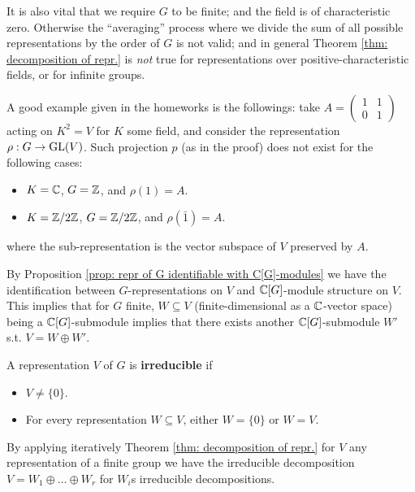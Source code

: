 \begin{remark}\label{rmk: counterexample for nonzero char. field or infintie group}
    It is also vital that we require $G$ to be finite; and the field is of characteristic zero. Otherwise the ``averaging'' process where we divide the sum of all possible representations by the order of $G$ is not valid; and in general Theorem \ref{thm: decomposition of repr.} is \emph{not} true for representations over positive-characteristic fields, or for infinite groups.
    
    A good example given in the homeworks is the followings: take $A = \begin{pmatrix} 1 & 1 \\ 0 & 1 \end{pmatrix}$ acting on $K^2 = V$ for $K$ some field, and consider the representation $\rho: G \to \mathrm{GL}(V)$. Such projection $p$ (as in the proof) does not exist for the following cases:
    \begin{itemize}
        \item $K = \mathbb{C}$, $G = \mathbb{Z}$, and $\rho(1) = A$.
        \item $K = \mathbb{Z}/2\mathbb{Z}$, $G = \mathbb{Z}/2\mathbb{Z}$, and $\rho(\bar{1}) = A$.
    \end{itemize}
    where the sub-representation is the vector subspace of $V$ preserved by $A$. 
\end{remark}

\begin{remark}
    By Proposition \ref{prop: repr of G identifiable with C[G]-modules} we have the identification between $G$-representations on $V$ and $\mathbb{C}[G]$-module structure on $V$. This implies that for $G$ finite, $W \subseteq V$ (finite-dimensional as a $\mathbb{C}$-vector space) being a $\mathbb{C}[G]$-submodule implies that there exists another $\mathbb{C}[G]$-submodule $W'$ s.t. $V = W \oplus W'$.
\end{remark}

\begin{definition}[Irreducible]
    A representation $V$ of $G$ is \textbf{irreducible} if
    \begin{itemize}
        \item $V \neq \{0\}$.
        \item For every representation $W \subseteq V$, either $W = \{0\}$ or $W = V$.
    \end{itemize}
\end{definition}

\begin{corollary}
    By applying iteratively Theorem \ref{thm: decomposition of repr.} for $V$ any representation of a finite group we have the irreducible decomposition $V = W_1 \oplus \dots \oplus W_r$ for $W_i$s irreducible decompositions.
\end{corollary}

